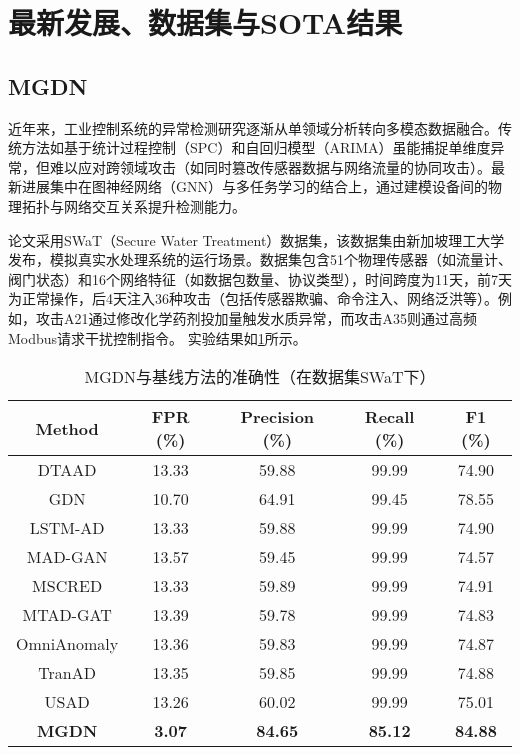 \section{最新发展、数据集与SOTA结果}

\subsection{MGDN}

近年来，工业控制系统的异常检测研究逐渐从单领域分析转向多模态数据融合。传统方法如基于统计过程控制（SPC）和自回归模型（ARIMA）虽能捕捉单维度异常，但难以应对跨领域攻击（如同时篡改传感器数据与网络流量的协同攻击）。最新进展集中在图神经网络（GNN）与多任务学习的结合上，通过建模设备间的物理拓扑与网络交互关系提升检测能力。

论文采用SWaT（Secure Water Treatment）数据集，该数据集由新加坡理工大学发布，模拟真实水处理系统的运行场景。数据集包含51个物理传感器（如流量计、阀门状态）和16个网络特征（如数据包数量、协议类型），时间跨度为11天，前7天为正常操作，后4天注入36种攻击（包括传感器欺骗、命令注入、网络泛洪等）。例如，攻击A21通过修改化学药剂投加量触发水质异常，而攻击A35则通过高频Modbus请求干扰控制指令。
实验结果如\cref{table:the accuracy of mgdn and the baseline methods using swat}所示。

\begin{table}[ht]
    \centering
    \caption{MGDN与基线方法的准确性（在数据集SWaT下）}
    \label{table:the accuracy of mgdn and the baseline methods using swat}
    \begin{tabular}{ccccc}
        \toprule
        \textbf{Method} & \textbf{FPR (\%)} & \textbf{Precision (\%)} & \textbf{Recall (\%)} & \textbf{F1 (\%)} \\
        \midrule
        DTAAD       & 13.33 & 59.88 & 99.99 & 74.90 \\
        GDN         & 10.70 & 64.91 & 99.45 & 78.55 \\
        LSTM-AD     & 13.33 & 59.88 & 99.99 & 74.90 \\
        MAD-GAN     & 13.57 & 59.45 & 99.99 & 74.57 \\
        MSCRED      & 13.33 & 59.89 & 99.99 & 74.91 \\
        MTAD-GAT    & 13.39 & 59.78 & 99.99 & 74.83 \\
        OmniAnomaly & 13.36 & 59.83 & 99.99 & 74.87 \\
        TranAD      & 13.35 & 59.85 & 99.99 & 74.88 \\
        USAD        & 13.26 & 60.02 & 99.99 & 75.01 \\
        \textbf{MGDN}   & \textbf{3.07} & \textbf{84.65} & \textbf{85.12} & \textbf{84.88} \\
        \bottomrule
    \end{tabular}
\end{table}

